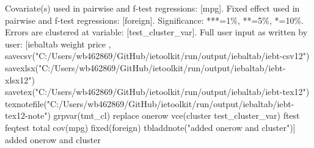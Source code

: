 Covariate(s) used in pairwise and f-test regressions: [mpg]. Fixed effect used in pairwise and f-test regressions: [foreign]. Significance: ***=1\%, **=5\%, *=10\%. Errors are clustered at variable: [test\_cluster\_var]. Full user input as written by user: [iebaltab weight price , savecsv("C:/Users/wb462869/GitHub/ietoolkit/run/output/iebaltab/iebt-csv12") savexlsx("C:/Users/wb462869/GitHub/ietoolkit/run/output/iebaltab/iebt-xlsx12") savetex("C:/Users/wb462869/GitHub/ietoolkit/run/output/iebaltab/iebt-tex12") texnotefile("C:/Users/wb462869/GitHub/ietoolkit/run/output/iebaltab/iebt-tex12-note") grpvar(tmt\_cl) replace onerow vce(cluster test\_cluster\_var) ftest feqtest total cov(mpg) fixed(foreign) tbladdnote("added onerow and cluster")] added onerow and cluster
